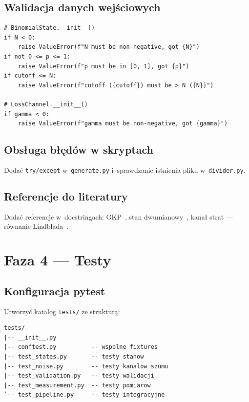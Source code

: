 \documentclass[12pt,a4paper]{article}
\begin{document}
\subsection{Walidacja danych wejściowych}

\begin{lstlisting}[caption={Przykłady walidacji parametrów.}, label={lst:validation}]
# BinomialState.__init__()
if N < 0:
    raise ValueError(f"N must be non-negative, got {N}")
if not 0 <= p <= 1:
    raise ValueError(f"p must be in [0, 1], got {p}")
if cutoff <= N:
    raise ValueError(f"cutoff ({cutoff}) must be > N ({N})")

# LossChannel.__init__()
if gamma < 0:
    raise ValueError(f"gamma must be non-negative, got {gamma}")
\end{lstlisting}

\subsection{Obsługa błędów w skryptach}

Dodać \texttt{try/except} w~\texttt{generate.py} i~sprawdzanie istnienia pliku w~\texttt{divider.py}.

\subsection{Referencje do literatury}

Dodać referencje w~docstringach: GKP~\cite{gottesman2001}, stan dwumianowy~\cite{michael2016}, kanał strat --- równanie Lindblada~\cite{lindblad1976, wiseman2009}.

\section{Faza 4 --- Testy}
\label{sec:faza4}

\subsection{Konfiguracja pytest}

Utworzyć katalog \texttt{tests/} ze strukturą:

\begin{lstlisting}[style=tree, caption={Struktura katalogu testów.}]
tests/
|-- __init__.py
|-- conftest.py          -- wspolne fixtures
|-- test_states.py       -- testy stanow
|-- test_noise.py        -- testy kanalow szumu
|-- test_validation.py   -- testy walidacji
|-- test_measurement.py  -- testy pomiarow
`-- test_pipeline.py     -- testy integracyjne
\end{lstlisting}
\end{document}
